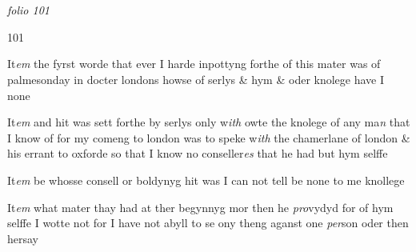 \documentclass[12pt, a4paper]{book}
\begin{document}
\dotfill
						  \section*{}  \subsection*{}

\textit{folio 101}



\begin{flushright}{\color{Mahogany}101}\end{flushright}

            		
            			
				\marginpar[\vspace{0.5cm}{\textcolor{Gray}{1.}}]{}
			
            			
		\ifthenelse{\isodd{\thepage}}
		{\reversemarginpar}
		{\normalmarginpar}
		 It\textit{em} the fyrst worde that ever I harde inpottyng forthe of
 	this mater was of palmesonday in docter londons howse of
 serlys \& hym \& oder knolege have I none
            		
				\marginpar[\vspace{0.5cm}{\textcolor{Gray}{2.}}]{}
			
		\ifthenelse{\isodd{\thepage}}
		{\reversemarginpar}
		{\normalmarginpar}
		 It\textit{em} and hit was sett forthe by serlys only w\textit{ith} owte the knolege
 of any ma\textit{n} that I know of for my comeng to london was
            			to speke w\textit{ith} the chamerlane of london \& his errant
            			to oxforde so that I know no conseller\textit{es} that he had but hym selffe
            		
            		
            			
				\marginpar[\vspace{0.5cm}{\textcolor{Gray}{3.}}]{}
			
            			
		\ifthenelse{\isodd{\thepage}}
		{\reversemarginpar}
		{\normalmarginpar}
		 It\textit{em} be whosse consell or boldynyg hit was I can not tell
 be none to me knollege
            		
            		
            			
				\marginpar[\vspace{0.5cm}{\textcolor{Gray}{4.}}]{}
			
            			
		\ifthenelse{\isodd{\thepage}}
		{\reversemarginpar}
		{\normalmarginpar}
		 It\textit{em} what mater thay had at ther begynnyg mor then he
 \textit{pro}vydyd for of hym selffe I wotte not for I have not abyll
 to se ony theng aganst one \textit{per}son oder then hersay
            		
\end{document}
